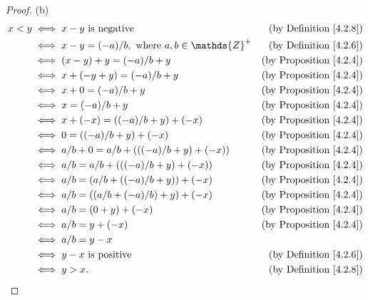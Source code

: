 \begin{proof}{(b)}
\begin{align*}
x < y & \iff x - y \text{ is negative} & \text{(by Definition \ref{4.2.8})} \\
& \iff x - y = (-a) / b, \text{ where } a, b \in \mathds{Z}^+ & \text{(by Definition \ref{4.2.6})} \\
& \iff (x - y) + y = (-a) / b + y & \text{(by Proposition \ref{4.2.4})} \\
& \iff x + (-y + y) = (-a) / b + y & \text{(by Proposition \ref{4.2.4})} \\
& \iff x + 0 = (-a) / b + y & \text{(by Proposition \ref{4.2.4})} \\
& \iff x = (-a) / b + y & \text{(by Proposition \ref{4.2.4})} \\
& \iff x + (-x) = ((-a) / b + y) + (-x) & \text{(by Proposition \ref{4.2.4})} \\
& \iff 0 = ((-a) / b + y) + (-x) & \text{(by Proposition \ref{4.2.4})} \\
& \iff a / b + 0 = a / b + (((-a) / b + y) + (-x)) & \text{(by Proposition \ref{4.2.4})} \\
& \iff a / b = a / b + (((-a) / b + y) + (-x)) & \text{(by Proposition \ref{4.2.4})} \\
& \iff a / b = (a / b + ((-a) / b + y)) + (-x) & \text{(by Proposition \ref{4.2.4})} \\
& \iff a / b = ((a / b + (-a) / b) + y) + (-x) & \text{(by Proposition \ref{4.2.4})} \\
& \iff a / b = (0 + y) + (-x) & \text{(by Proposition \ref{4.2.4})} \\
& \iff a / b = y + (-x) & \text{(by Proposition \ref{4.2.4})} \\
& \iff a / b = y - x \\
& \iff y - x \text{ is positive} & \text{(by Definition \ref{4.2.6})} \\
& \iff y > x. & \text{(by Definition \ref{4.2.8})}
\end{align*}
\end{proof}

